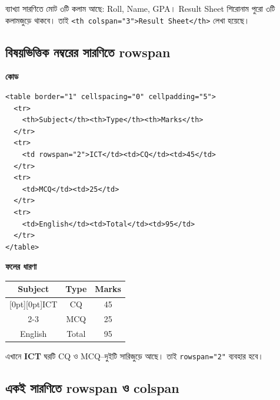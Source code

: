 \begin{keypointbox}{ব্যাখ্যা}
সারণিতে মোট ৩টি কলাম আছে: Roll, Name, GPA। Result Sheet শিরোনাম পুরো ৩টি কলামজুড়ে থাকবে। তাই \texttt{<th colspan="3">Result Sheet</th>} লেখা হয়েছে।
\end{keypointbox}

\subsection{বিষয়ভিত্তিক নম্বরের সারণিতে rowspan}

\par\noindent
\begin{minipage}[t]{.54\linewidth}\vspace{0pt}\small
\textbf{\color{chFourTeal}কোড}\par
\begin{verbatim}
<table border="1" cellspacing="0" cellpadding="5">
  <tr>
    <th>Subject</th><th>Type</th><th>Marks</th>
  </tr>
  <tr>
    <td rowspan="2">ICT</td><td>CQ</td><td>45</td>
  </tr>
  <tr>
    <td>MCQ</td><td>25</td>
  </tr>
  <tr>
    <td>English</td><td>Total</td><td>95</td>
  </tr>
</table>
\end{verbatim}
\par\smallskip
\end{minipage}\hfill
\begin{minipage}[t]{.42\linewidth}\vspace{0pt}\small
\textbf{\color{chFourTeal}ফলের ধারণা}\par
\begin{center}
\begin{tabular}{|c|c|c|}
\hline
\textbf{Subject} & \textbf{Type} & \textbf{Marks} \\
\hline
\raisebox{-.5\normalbaselineskip}[0pt][0pt]{ICT} & CQ & 45 \\
\cline{2-3}
 & MCQ & 25 \\
\hline
English & Total & 95 \\
\hline
\end{tabular}
\end{center}
এখানে \textbf{ICT} ঘরটি CQ ও MCQ--দুইটি সারিজুড়ে আছে। তাই \texttt{rowspan="2"} ব্যবহার হবে।
\par\smallskip
\end{minipage}\par


\subsection{একই সারণিতে rowspan ও colspan}

